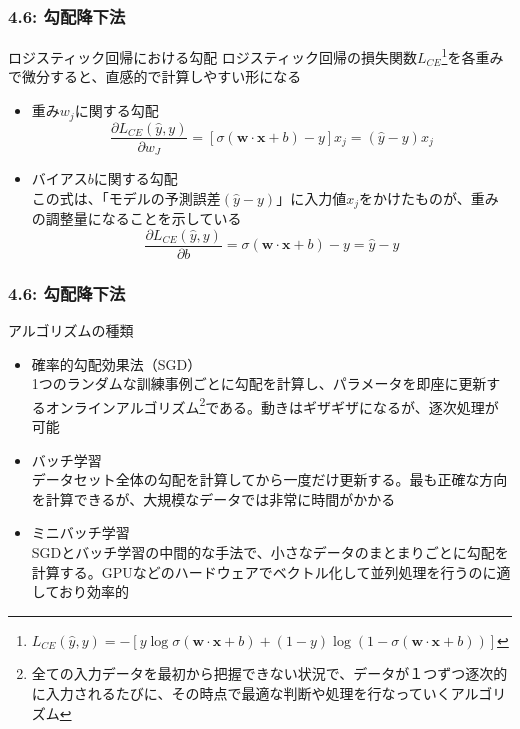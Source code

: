 \documentclass[unicode,11pt]{beamer} %
\begin{document}
\begin{frame}
    \frametitle{4.6: 勾配降下法}
    \begin{alertblock}{ロジスティック回帰における勾配}
        ロジスティック回帰の損失関数$L_{CE}$\footnote{$L_{CE} (\hat{y}, y) = -[y \log \sigma (\boldsymbol{w} \cdot \boldsymbol{x} + b) + (1 - y) \log (1 - \sigma (\boldsymbol{w} \cdot \boldsymbol{x} + b))]$}を各重みで微分すると、直感的で計算しやすい形になる
        \begin{itemize}
            \item 重み$w_j$に関する勾配
            \begin{equation*}
                \frac{\partial L_{CE} (\hat{y}, y)}{\partial w_J} = [\sigma (\boldsymbol{w} \cdot \boldsymbol{x} + b) - y]x_j
                                                                  = (\hat{y} - y)x_j
            \end{equation*}
            \item バイアス$b$に関する勾配\\この式は、「モデルの予測誤差$(\hat{y} - y)$」に入力値$x_j$をかけたものが、重みの調整量になることを示している
            \begin{equation*}
                \frac{\partial L_{CE} (\hat{y}, y)}{\partial b} = \sigma (\boldsymbol{w} \cdot \boldsymbol{x} + b) - y = \hat{y} - y
            \end{equation*}
        \end{itemize}
    \end{alertblock}
\end{frame}

\begin{frame}
    \frametitle{4.6: 勾配降下法}
    \begin{alertblock}{アルゴリズムの種類}
        \begin{itemize}
            \item 確率的勾配効果法（SGD）\\1つのランダムな訓練事例ごとに勾配を計算し、パラメータを即座に更新するオンラインアルゴリズム\footnote{全ての入力データを最初から把握できない状況で、データが１つずつ逐次的に入力されるたびに、その時点で最適な判断や処理を行なっていくアルゴリズム}である。動きはギザギザになるが、逐次処理が可能
            \item バッチ学習\\データセット全体の勾配を計算してから一度だけ更新する。最も正確な方向を計算できるが、大規模なデータでは非常に時間がかかる
            \item ミニバッチ学習\\SGDとバッチ学習の中間的な手法で、小さなデータのまとまりごとに勾配を計算する。GPUなどのハードウェアでベクトル化して並列処理を行うのに適しており効率的
        \end{itemize}
    \end{alertblock}
\end{frame}
\end{document}
